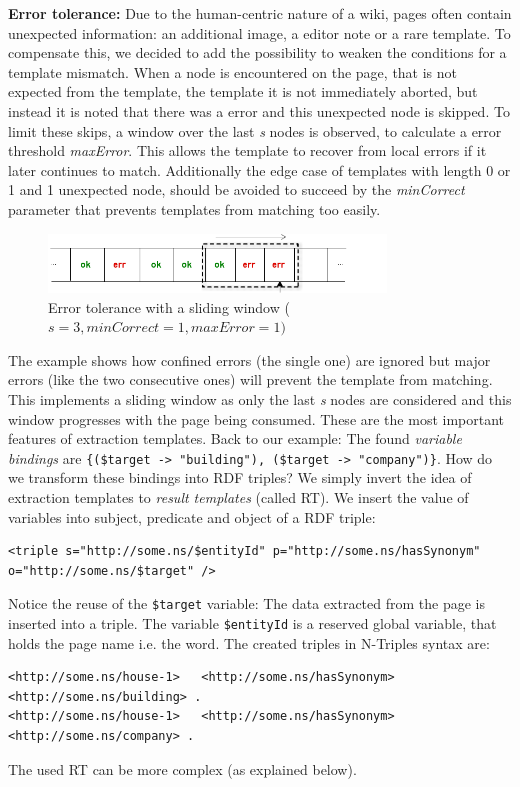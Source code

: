 \textbf{Error tolerance:}
Due to the human-centric nature of a wiki, pages often contain unexpected information: an additional image, a editor note or a rare template. 
To compensate this, we decided to add the possibility to weaken the conditions for a template mismatch. 
When a node is encountered on the page, that is not expected from the template, the template it is not immediately aborted, but instead it is noted that there was a error and this unexpected node is skipped. 
To limit these skips, a window over the last \textit{s} nodes is observed, to calculate a error threshold \textit{maxError}. 
This allows the template to recover from local errors if it later continues to match. 
Additionally the edge case of templates with length 0 or 1 and 1 unexpected node, should be avoided to succeed by the \textit{minCorrect} parameter that prevents templates from matching too easily.
\begin{figure}[h]
\centering
\includegraphics[width=0.8\textwidth]{../images/sliding}
\caption{Error tolerance with a sliding window ($\textit{s}=3, \textit{minCorrect}=1, \textit{maxError}=1)$}
\label{fig:sliding}
\end{figure}
The example shows how confined errors (the single one) are ignored but major errors (like the two consecutive ones) will prevent the template from matching.
This implements a sliding window as only the last \textit{s} nodes are considered and this window progresses with the page being consumed.\newline
These are the most important features of extraction templates.\newline
Back to our example:
The found \textit{variable bindings} are \texttt{\{(\$target -> "building"), (\$target -> "company")\}}. 
How do we transform these bindings into RDF triples? We simply invert the idea of extraction templates to \textit{result templates} (called RT). We insert the value of variables into subject, predicate and object of a RDF triple:
\begin{lstlisting}[style=XML]
<triple s="http://some.ns/$entityId" p="http://some.ns/hasSynonym" o="http://some.ns/$target" />
\end{lstlisting}
Notice the reuse of the \texttt{\$target} variable:
The data extracted from the page is inserted into a triple.
The variable \texttt{\$entityId} is a reserved global variable, that holds the page name i.e. the word.
The created triples in N-Triples syntax are:
\begin{lstlisting}[style=N3]
<http://some.ns/house-1>   <http://some.ns/hasSynonym>   <http://some.ns/building> .
<http://some.ns/house-1>   <http://some.ns/hasSynonym>   <http://some.ns/company> .
\end{lstlisting}
The used RT can be more complex (as explained below).

